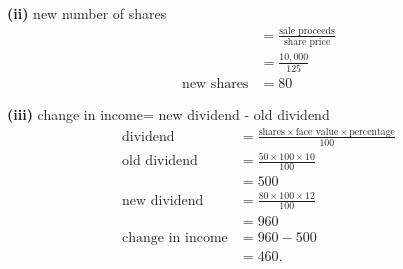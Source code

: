 \documentclass[journal,12pt,twocolumn]{IEEEtran}
\begin{document}
\bigskip

\textbf{(ii)}
new number of shares
\begin{align*}
&=\frac{\text{sale proceeds}}{\text{share price}}\\
&=\frac{10,000}{125}\\
\text{new shares}&=80
\end{align*}

\bigskip

\textbf{(iii)} 
change in income= new dividend - old dividend\\
\begin{align*}
\text{dividend}&=\frac{\text{shares} \times \text{face value} \times \text{percentage}}{100}\\
\text{old dividend}&=\frac{50 \times 100 \times 10}{100}\\
&=500\\
\text{new dividend}&=\frac{80 \times 100 \times 12}{100}\\
&=960\\
\text{change in income}&=960-500\\
&=460.
\end{align*}
\end{document}
